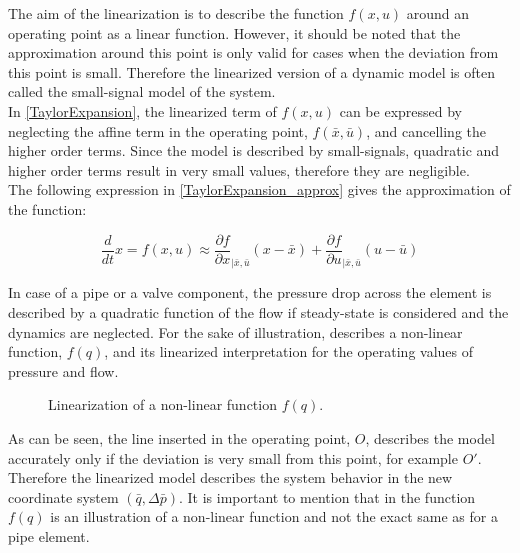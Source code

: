 The aim of the linearization is to describe the function $f(x,u)$ around an operating point as a linear function. However, it should be noted that the approximation around this point is only valid for cases when the deviation from this point is small. Therefore the linearized version of a dynamic model is often called the small-signal model of the system. 
\\
In \eqref{TaylorExpansion}, the linearized term of $f(x,u)$ can be expressed by neglecting the affine term in the operating point, $f(\bar{x},\bar{u})$, and cancelling the higher order terms. Since the model is described by small-signals, quadratic and higher order terms result in very small values, therefore they are negligible. 
\\
The following expression in \eqref{TaylorExpansion_approx} gives the approximation of the function: 

\begin{equation}
\frac{d}{dt} x = f(x,u) \approx \frac{\partial f}{\partial x}_{|\bar{x}, \bar{u}} (x-\bar{x}) + \frac{\partial f}{\partial u}_{|\bar{x}, \bar{u}} (u-\bar{u}) 
 \label{TaylorExpansion_approx}
\end{equation}

In case of a pipe or a valve component, the pressure drop across the element is described by a quadratic function of the flow if steady-state is considered and the dynamics are neglected. For the sake of illustration,  describes a non-linear function, $f(q)$, and its linearized interpretation for the operating values of pressure and flow. 

\begin{figure}[H]
\centering
 
\caption{Linearization of a non-linear function $f(q).$}
\label{fig:linearization}
\end{figure}

As can be seen, the line inserted in the operating point, $O$, describes the model accurately only if the deviation is very small from this point, for example $O'$. Therefore the linearized model describes the system behavior in the new coordinate system $(\bar{q},\Delta \bar{p})$. It is important to mention that in  the function $f(q)$ is an illustration of a non-linear function and not the exact same as for a pipe element. 

